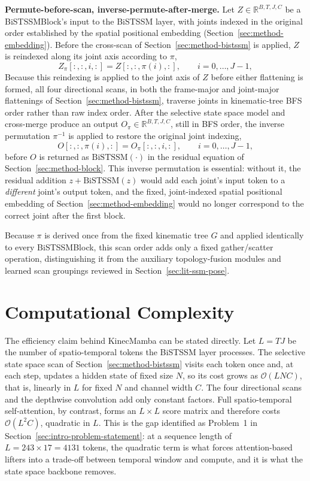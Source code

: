\textbf{Permute-before-scan, inverse-permute-after-merge.} Let $Z \in
\mathbb{R}^{B,T,J,C}$ be a BiSTSSMBlock's input to the BiSTSSM layer, with
joints indexed in the original order established by the spatial
positional embedding (Section~\ref{sec:method-embedding}). Before the
cross-scan of Section~\ref{sec:method-bistssm} is applied, $Z$ is reindexed
along its joint axis according to $\pi$,
\begin{equation}
Z_\pi[:,:,i,:] = Z[:,:,\pi(i),:], \qquad i = 0, \ldots, J-1,
\end{equation}
Because this reindexing is applied to the joint axis of $Z$ before either
flattening is formed, all four directional scans, in both the frame-major
and joint-major flattenings of Section~\ref{sec:method-bistssm}, traverse
joints in kinematic-tree BFS order rather than raw index order. After the selective state space model
and cross-merge produce an output $O_\pi \in \mathbb{R}^{B,T,J,C}$, still
in BFS order, the inverse permutation $\pi^{-1}$ is applied to restore the
original joint indexing,
\begin{equation}
O[:,:,\pi(i),:] = O_\pi[:,:,i,:], \qquad i = 0, \ldots, J-1,
\end{equation}
before $O$ is returned as $\mathrm{BiSTSSM}(\cdot)$ in the residual
equation of Section~\ref{sec:method-block}. This inverse permutation is
essential: without it, the residual addition $z + \mathrm{BiSTSSM}(z)$
would add each joint's input token to a \emph{different} joint's output
token, and the fixed, joint-indexed spatial positional embedding of
Section~\ref{sec:method-embedding} would no longer correspond to the
correct joint after the first block.

Because $\pi$ is derived once from the fixed kinematic tree $G$ and
applied identically to every BiSTSSMBlock, this scan order adds only a
fixed gather/scatter operation, distinguishing it from the auxiliary
topology-fusion modules and learned scan groupings reviewed in
Section~\ref{sec:lit-ssm-pose}.

\section{Computational Complexity}
\label{sec:method-complexity}

The efficiency claim behind KinecMamba can be stated directly. Let $L = TJ$
be the number of spatio-temporal tokens the BiSTSSM layer processes. The
selective state space scan of Section~\ref{sec:method-bistssm} visits each
token once and, at each step, updates a hidden state of fixed size $N$, so
its cost grows as $\mathcal{O}(L N C)$, that is, linearly in $L$ for fixed
$N$ and channel width $C$. The four directional scans and the depthwise
convolution add only constant factors. Full spatio-temporal self-attention,
by contrast, forms an $L \times L$ score matrix and therefore costs
$\mathcal{O}(L^{2} C)$, quadratic in $L$. This is the gap identified as
Problem~1 in Section~\ref{sec:intro-problem-statement}: at a sequence length
of $L = 243 \times 17 = 4131$ tokens, the quadratic term is what forces
attention-based lifters into a trade-off between temporal window and
compute, and it is what the state space backbone removes.

